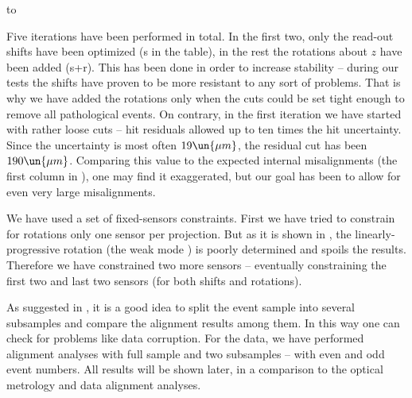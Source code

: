 \hbox to

\noindent Five iterations have been performed in total. In the first two, only the read-out shifts have been optimized (s in the table), in the rest the rotations about $z$ have been added (s+r). This has been done in order to increase stability -- during our  tests the shifts have proven to be more resistant to any sort of problems. That is why we have added the rotations only when the cuts could be set tight enough to remove all pathological events. On contrary, in the first iteration we have started with rather loose cuts -- hit residuals allowed up to ten times the hit uncertainty. Since the uncertainty is most often $19\un{\mu m}$, the residual cut has been $190\un{\mu m}$. Comparing this value to the expected internal misalignments (the first column in ), one may find it exaggerated, but our goal has been to allow for even very large misalignments.


We have used a set of fixed-sensors constraints. First we have tried to constrain for rotations only one sensor per projection. But as it is shown in , the linearly-progressive rotation (the weak mode ) is poorly determined and spoils the results. Therefore we have constrained two more sensors -- eventually constraining the first two and last two sensors (for both shifts and rotations).


As suggested in , it is a good idea to split the event sample into several subsamples and compare the alignment results among them. In this way one can check for problems like data corruption. For the  data, we have performed alignment analyses with full sample and two subsamples -- with even and odd event numbers. All results will be shown later, in a comparison to the optical metrology and  data alignment analyses.


